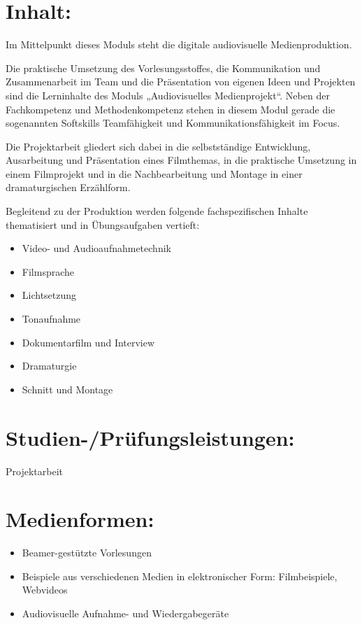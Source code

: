 \section*{Inhalt:}\label{inhalt-2}

Im Mittelpunkt dieses Moduls steht die digitale audiovisuelle
Medienproduktion.

Die praktische Umsetzung des Vorlesungsstoffes, die Kommunikation und
Zusammenarbeit im Team und die Präsentation von eigenen Ideen und
Projekten sind die Lerninhalte des Moduls „Audiovisuelles
Medienprojekt``. Neben der Fachkompetenz und Methodenkompetenz stehen in
diesem Modul gerade die sogenannten Softskills Teamfähigkeit und
Kommunikationsfähigkeit im Focus.

Die Projektarbeit gliedert sich dabei in die selbstständige Entwicklung,
Ausarbeitung und Präsentation eines Filmthemas, in die praktische
Umsetzung in einem Filmprojekt und in die Nachbearbeitung und Montage in
einer dramaturgischen Erzählform.

Begleitend zu der Produktion werden folgende fachspezifischen Inhalte
thematisiert und in Übungsaufgaben vertieft:

\begin{itemize}
\tightlist
\item
  Video- und Audioaufnahmetechnik
\item
  Filmsprache
\item
  Lichtsetzung
\item
  Tonaufnahme
\item
  Dokumentarfilm und Interview
\item
  Dramaturgie
\item
  Schnitt und Montage
\end{itemize}

\section*{Studien-/Prüfungsleistungen:}\label{studien-pruxfcfungsleistungen-2}

Projektarbeit

\section*{Medienformen:}\label{medienformen-2}

\begin{itemize}
\tightlist
\item
  Beamer-gestützte Vorlesungen
\item
  Beispiele aus verschiedenen Medien in elektronischer Form:
  Filmbeispiele, Webvideos
\item
  Audiovisuelle Aufnahme- und Wiedergabegeräte
\end{itemize}

